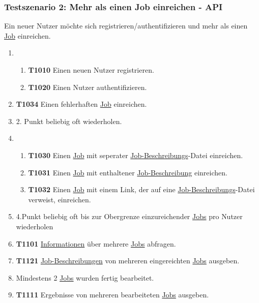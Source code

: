 \subsubsection{Testszenario 2: Mehr als einen Job einreichen - API}
Ein neuer \gls{Nutzer} möchte sich registrieren/authentifizieren und mehr als einen \hyperref[B:Jobs]{Job} einreichen.

\begin{enumerate}
    \item 
    \begin{enumerate}
        \item \textbf{T1010} Einen neuen \gls{Nutzer} registrieren.
        
        \item \textbf{T1020} Einen \gls{Nutzer} authentifizieren.
    \end{enumerate}
    
    \item \textbf{T1034} Einen fehlerhaften \hyperref[B:Jobs]{Job} einreichen.
    
    \item 2. Punkt beliebig oft wiederholen.
    
    \item 
    \begin{enumerate}
        \item \textbf{T1030} Einen \hyperref[B:Jobs]{Job} mit seperater \hyperref[B:Job-Beschreibung]{Job-Beschreibungs}-Datei einreichen. 
        
        \item \textbf{T1031} Einen \hyperref[B:Jobs]{Job} mit enthaltener \hyperref[B:Job-Beschreibung]{Job-Beschreibung} einreichen.
        
        \item \textbf{T1032} Einen \hyperref[B:Jobs]{Job} mit einem Link, der auf eine \hyperref[B:Job-Beschreibung]{Job-Beschreibungs}-Datei verweist, einreichen.
    \end{enumerate}
    
    \item 4.Punkt beliebig oft bis zur Obergrenze einzureichender \hyperref[B:Jobs]{Jobs} pro \gls{Nutzer} wiederholen
    
    \item \textbf{T1101} \hyperref[B:Job-Informationen]{Informationen} über mehrere \hyperref[B:Jobs]{Jobs} abfragen. 
    
    \item \textbf{T1121} \hyperref[B:Job-Beschreibung]{Job-Beschreibungen} von mehreren eingereichten \hyperref[B:Jobs]{Jobs} ausgeben.
    
    \item Mindestens 2 \hyperref[B:Jobs]{Jobs} wurden fertig bearbeitet.
    
    \item \textbf{T1111} Ergebnisse von mehreren bearbeiteten \hyperref[B:Jobs]{Jobs} ausgeben. 
\end{enumerate}

